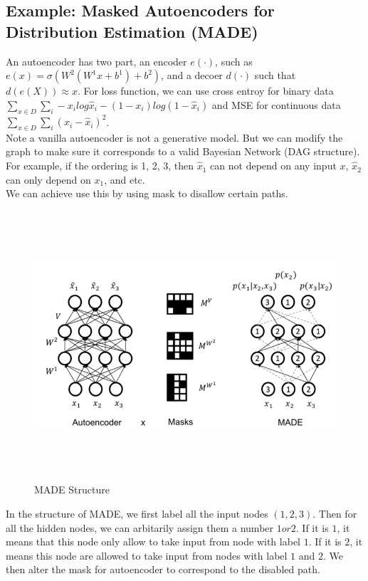 \subsection{Example: Masked Autoencoders for Distribution Estimation (MADE)}
An autoencoder has two part, an encoder $e(\cdot)$, such as $e(x) = \sigma(W^2(W^1x+b^1)+b^2)$, and a decoer $d(\cdot)$ such that $d(e(X))\approx x$. For loss function, we can use cross entroy for binary data $\sum_{x\in D} \sum_i -x_i log\hat{x}_i - (1-x_i)log(1-\hat{x}_i)$ and MSE for continuous data $\sum_{x\in D}\sum_i (x_i - \hat{x}_i)^2$. \\

Note a vanilla autoencoder is not a generative model. But we can modify the graph to make sure it corresponds to a valid Bayesian Network (DAG structure). For example, if the ordering is 1, 2, 3, then $\hat{x}_1$ can not depend on any input $x$, $\hat{x}_2$ can only depend on $x_1$, and etc.  \\

We can achieve use this by using mask to disallow certain paths. 
\begin{figure}[h]
    \centering
    \includegraphics[width=12cm, height=10cm]{images/001_MADE.png}
    \caption{MADE Structure}
\end{figure}

In the structure of MADE, we first label all the input nodes $(1,2,3)$. Then for all the hidden nodes, we can arbitarily assign them a number $1 or 2$. If it is $1$, it means that this node only allow to take input from node with label $1$. If it is $2$, it means this node are allowed to take input from nodes with label $1$ and $2$. We then alter the mask for autoencoder to correspond to the disabled path. 



